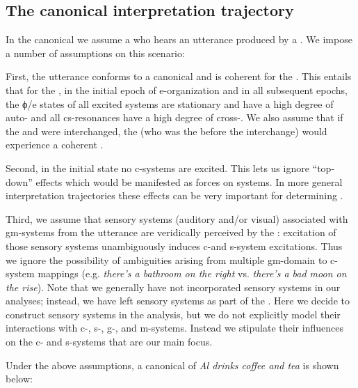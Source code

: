 \subsection{The canonical interpretation trajectory}

In the canonical  we assume a  who hears an utterance produced by a . We impose a number of assumptions on this scenario:

First, the utterance conforms to a canonical  and is coherent for the . This entails that for the , in the initial epoch of e-or\-ga\-ni\-za\-tion and in all subsequent epochs, the ϕ/e states of all excited systems are stationary and have a high degree of auto- and all cs-resonances have a high degree of cross-. We also assume that if the  and  were interchanged, the  (who was the  before the interchange) would experience a coherent . 

Second, in the initial state no c-sys\-tems are excited. This lets us ignore “top-down” effects which would be manifested as  forces on systems. In more general interpretation trajectories these effects can be very important for determining .

Third, we assume that sensory systems (auditory and/or visual) associated with gm-sys\-tems from the utterance are veridically perceived by the : excitation of those sensory systems unambiguously induces c-and s-sys\-tem excitations. Thus we ignore the possibility of ambiguities arising from multiple gm-domain to c-sys\-tem mappings (e.g. \textit{there’s a bathroom on the right} vs. \textit{there’s a bad moon on the rise}). Note that we generally have not incorporated sensory systems in our analyses; instead, we have left sensory systems as part of the . Here we decide to construct sensory systems in the analysis, but we do not explicitly model their interactions with c-, s-, g-, and m-sys\-tems. Instead we stipulate their influences on the c- and s-sys\-tems that are our main focus.

Under the above assumptions, a canonical  of \textit{Al drinks coffee and tea} is shown below:

